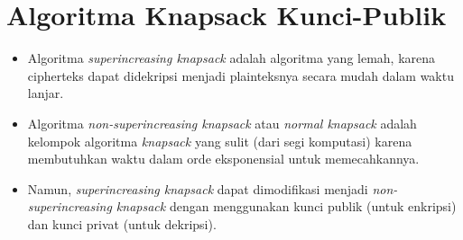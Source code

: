 \documentclass{article}
\begin{document}

\section*{Algoritma Knapsack Kunci-Publik}

\begin{itemize}
    \item Algoritma \textit{superincreasing knapsack} adalah algoritma yang lemah, karena cipherteks dapat didekripsi menjadi plainteksnya secara mudah dalam waktu lanjar.
    \item Algoritma \textit{non-superincreasing knapsack} atau \textit{normal knapsack} adalah kelompok algoritma \textit{knapsack} yang sulit (dari segi komputasi) karena membutuhkan waktu dalam orde eksponensial untuk memecahkannya.
    \item Namun, \textit{superincreasing knapsack} dapat dimodifikasi menjadi \textit{non-superincreasing knapsack} dengan menggunakan kunci publik (untuk enkripsi) dan kunci privat (untuk dekripsi).
\end{itemize}
\end{document}
